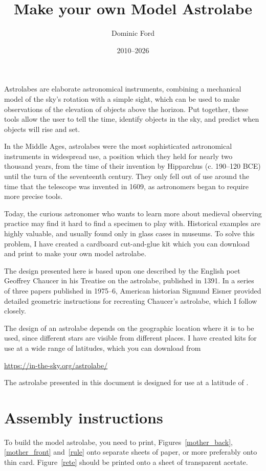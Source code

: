 \documentclass[a4paper,onecolumn,10pt]{article}
\title{Make your own Model Astrolabe}
\author{Dominic Ford}
\date{2010--2026}
\begin{document}
\maketitle
\setcounter{footnote}{1}

Astrolabes are elaborate astronomical instruments, combining a mechanical model
of the sky's rotation with a simple sight, which can be used to make
observations of the elevation of objects above the horizon. Put together, these
tools allow the user to tell the time, identify objects in the sky, and predict
when objects will rise and set.

In the Middle Ages, astrolabes were the most sophisticated astronomical
instruments in widespread use, a position which they held for nearly two
thousand years, from the time of their invention by Hipparchus (c. 190--120
BCE) until the turn of the seventeenth century. They only fell out of use
around the time that the telescope was invented in 1609, as astronomers began
to require more precise tools.

Today, the curious astronomer who wants to learn more about medieval observing
practice may find it hard to find a specimen to play with. Historical examples
are highly valuable, and usually found only in glass cases in museums. To solve
this problem, I have created a cardboard cut-and-glue kit which you can
download and print to make your own model astrolabe.

The design presented here is based upon one described by the English poet
Geoffrey Chaucer in his Treatise on the astrolabe, published in 1391. In a
series of three papers published in 1975--6, American historian Sigmund Eisner
provided detailed geometric instructions for recreating Chaucer's astrolabe,
which I follow closely.

The design of an astrolabe depends on the geographic location where it is to be
used, since different stars are visible from different places. I have created
kits for use at a wide range of latitudes, which you can download from

\url{https://in-the-sky.org/astrolabe/}

The astrolabe presented in this document is designed for use at a latitude of
.

\section*{Assembly instructions}

To build the model astrolabe, you need to print, Figures~\ref{mother_back},
\ref{mother_front} and~\ref{rule} onto separate sheets of paper, or more
preferably onto thin card. Figure~\ref{rete} should be printed onto a sheet of
transparent acetate.
\end{document}
